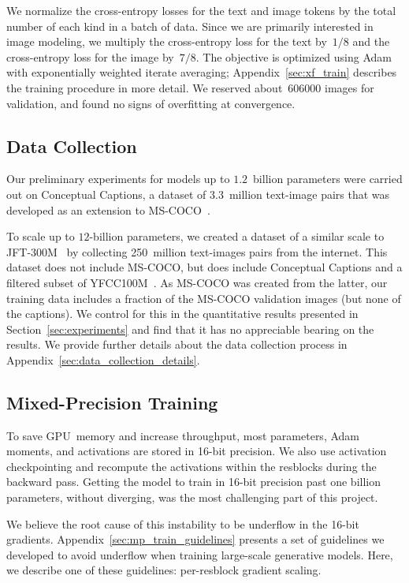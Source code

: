 We normalize the cross-entropy losses for the text and image tokens by the total number of each kind in a batch of data. Since we are primarily interested in image modeling, we multiply the cross-entropy loss for the text by~$1 / 8$ and the cross-entropy loss for the image by~$7 / 8$. The objective is optimized using Adam with exponentially weighted iterate averaging; Appendix~\ref{sec:xf_train} describes the training procedure in more detail. We reserved about~\num{606000} images for validation, and found no signs of overfitting at convergence.

\subsection{Data Collection}
\label{sec:data_collection}

Our preliminary experiments for models up to $1.2$~billion parameters were carried out on Conceptual Captions, a dataset of 3.3~million text-image pairs that was developed as an extension to MS-COCO~\cite{lin2014microsoft}. 

To scale up to $12$-billion parameters, we created a dataset of a similar scale to JFT-300M~\cite{sun2017revisiting} by collecting 250~million text-images pairs from the internet. This dataset does not include MS-COCO, but does include Conceptual Captions and a filtered subset of YFCC100M~\cite{thomee2016yfcc100m}. As MS-COCO was created from the latter, our training data includes a fraction of the MS-COCO validation images (but none of the captions). We control for this in the quantitative results presented in Section~\ref{sec:experiments} and find that it has no appreciable bearing on the results. We provide further details about the data collection process in Appendix~\ref{sec:data_collection_details}.

\subsection{Mixed-Precision Training}
\label{sec:mp_train}

To save GPU~memory and increase throughput, most parameters, Adam moments, and activations are stored in 16-bit precision. We also use activation checkpointing and recompute the activations within the resblocks during the backward pass. Getting the model to train in 16-bit precision past one billion parameters, without diverging, was the most challenging part of this project.

We believe the root cause of this instability to be underflow in the 16-bit gradients. Appendix~\ref{sec:mp_train_guidelines} presents a set of guidelines we developed to avoid underflow when training large-scale generative models. Here, we describe one of these guidelines: per-resblock gradient scaling.

